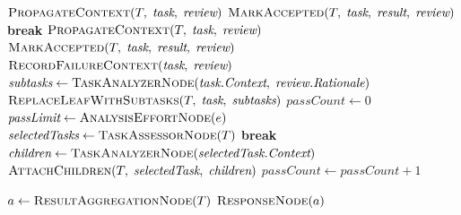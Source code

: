 \documentclass{article}
\begin{document}
\begin{algorithm}[t]
\begin{algorithmic}[1]
            \State $\textsc{PropagateContext}(T,\; \textit{task},\; \textit{review})$
            \State $\textsc{MarkAccepted}(T,\; \textit{task},\; \textit{result},\; \textit{review})$
            \State \textbf{break}
        \Else
            \State $\textsc{PropagateContext}(T,\; \textit{task},\; \textit{review})$
            \State $\textsc{MarkAccepted}(T,\; \textit{task},\; \textit{result},\; \textit{review})$
        \EndIf
        \State $\textsc{RecordFailureContext}(\textit{task},\; \textit{review})$
        \State $\textit{subtasks} \gets \textsc{TaskAnalyzerNode}(\textit{task.Context},\; \textit{review.Rationale})$
        \State $\textsc{ReplaceLeafWithSubtasks}(T,\; \textit{task},\; \textit{subtasks})$
        \State $\textit{passCount} \gets 0$
        \State $\textit{passLimit} \gets \textsc{AnalysisEffortNode}(e)$
            \State $\textit{selectedTasks} \gets \textsc{TaskAssessorNode}(T)$
                \State \textbf{break}
            \EndIf
                \State $\textit{children} \gets \textsc{TaskAnalyzerNode}(\textit{selectedTask.Context})$
                \State $\textsc{AttachChildren}(T,\; \textit{selectedTask},\; \textit{children})$
            \EndFor
            \State $\textit{passCount} \gets \textit{passCount} + 1$
        \EndWhile
    \EndIf
\EndWhile

\State $a \gets \textsc{ResultAggregationNode}(T)$
\State \Return $\textsc{ResponseNode}(a)$
\end{algorithmic}
\end{algorithm}
\end{document}
